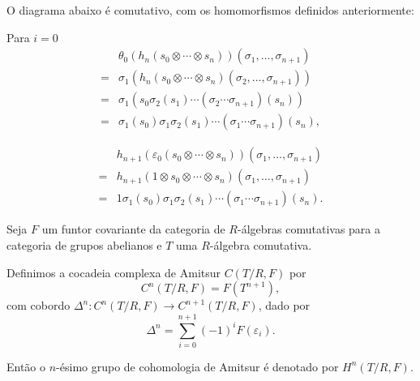 \documentclass{beamer}
\begin{document}
\begin{frame}[fragile]
    O diagrama abaixo é comutativo, com os homomorfismos definidos anteriormente:
    \begin{center}
    \end{center}
\end{frame}

\begin{frame}{Para $i = 0$}
    \[\begin{array}{rl}
    & \theta_0(h_n(s_0\otimes\cdots\otimes s_n))(\sigma_1,\dots,\sigma_{n+1})  \\
    =& \sigma_1(h_n(s_0\otimes\cdots\otimes s_n)(\sigma_2,\dots,\sigma_{n+1})) \\
    =& \sigma_1\left(s_0\sigma_2(s_1)\cdots(\sigma_2\cdots\sigma_{n+1})(s_n)\right) \\
    =& \sigma_1(s_0)\sigma_1\sigma_2(s_1)\cdots(\sigma_1\cdots\sigma_{n+1})(s_n),
\end{array}\]

\vspace{18pt}

\[\begin{array}{rl}
    & h_{n+1}(\varepsilon_0(s_0\otimes\cdots\otimes s_n))(\sigma_1,\dots,\sigma_{n+1}) \\
    =& h_{n+1}(1\otimes s_0\otimes\cdots\otimes s_n)(\sigma_1,\dots,\sigma_{n+1}) \\
    =& 1\sigma_1(s_0)\sigma_1\sigma_2(s_1)\cdots(\sigma_1\cdots\sigma_{n+1})(s_n).
\end{array}\]
\end{frame}


\begin{frame}
    Seja $F$ um funtor covariante da categoria de $R$-álgebras comutativas para a categoria de grupos abelianos e $T$ uma $R$-álgebra comutativa.

    Definimos a cocadeia complexa de Amitsur $C(T/R, F)$ por \[C^n(T/R, F) = F(T^{n+1}),\]
    com cobordo $\Delta^n: C^n(T/R, F) \rightarrow C^{n+1}(T/R, F)$, dado por \[\Delta^n = \sum_{i=0}^{n+1}(-1)^i F(\varepsilon_i).\]
    
    Então o $n$-ésimo grupo de cohomologia de Amitsur é denotado por $H^n(T/R,F)$.
\end{frame}
\end{document}
